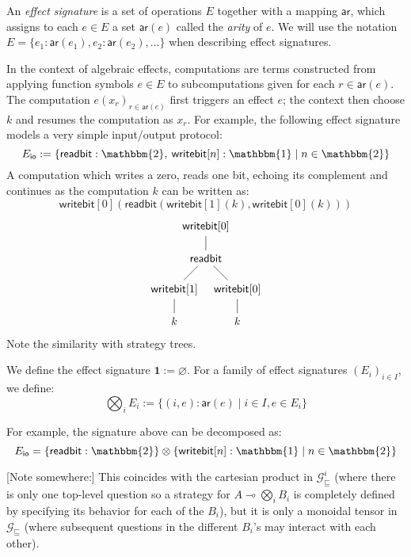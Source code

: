 \documentclass[format=sigplan,authordraft]{acmart}
\newcommand{\gcat}{\mathcal{G}_{\sqsubseteq}}
\newcommand{\kw}[1]{\ensuremath{\mathsf{#1}}}
\begin{document}
\begin{definition}
An \emph{effect signature}
is a set of operations $E$
together with a mapping $\kw{ar}$,
which assigns to each $e \in E$ a set $\kw{ar}(e)$
called the \emph{arity} of $e$.
We will use the notation
$E = \{ e_1 : \kw{ar}(e_1), e_2 : \kw{ar}(e_2), \ldots \}$
when describing effect signatures.
\end{definition}

In the context of algebraic effects,
computations are terms constructed from
applying function symbols $e \in E$
to subcomputations given for each $r \in \kw{ar}(e)$.
The computation $e(x_r)_{r \in \kw{ar}(e)}$
first triggers an effect $e$;
the context then choose $k$
and resumes the computation as $x_r$.
For example,
the following effect signature
models a very simple input/output protocol:
\[
  E_\kw{io} :=
    \{ \kw{readbit} : \mathbbm{2}, \:
       \kw{writebit}[n] : \mathbbm{1} \mid
       n \in \mathbbm{2} \}
\]
A computation which writes a zero,
reads one bit, echoing its complement
and continues as the computation $k$
can be written as:
\[
  \kw{writebit}[0](
    \kw{readbit}(
      \kw{writebit}[1](k),
      \kw{writebit}[0](k)))
\]
\[
  \begin{tikzpicture}
    \node (W) at (0,0) {$\kw{writebit}[0]$};
    \node (R) at (0,-1) {$\kw{readbit}$};
    \node (W0) at (-1,-2) {$\kw{writebit}[1]$};
    \node (W1) at (+1,-2) {$\kw{writebit}[0]$};
    \node (K0) at (-1,-3) {$k$};
    \node (K1) at (+1,-3) {$k$};
    \path (W) edge (R);
    \path (R) edge (W0);
    \path (R) edge (W1);
    \path (W0) edge (K0);
    \path (W1) edge (K1);
  \end{tikzpicture}
\]
Note the similarity with strategy trees.

\begin{definition}
We define the effect signature
$\mathbf{1} := \varnothing$.
For a family of effect signatures $(E_i)_{i \in I}$,
we define:
\[
  \bigotimes_i E_i := \{ (i, e) : \kw{ar}(e) \mid i \in I, e \in E_i \}
\]
\end{definition}

For example,
the signature above can be decomposed as:
\[
    E_\kw{io} = \{ \kw{readbit} : \mathbbm{2} \} \otimes
      \{ \kw{writebit}[n] : \mathbbm{1} \mid n \in \mathbbm{2} \}
\]

[Note somewhere:]
This coincides with the cartesian product in $\gcat^i$
(where there is only one top-level question
so a strategy for $A \multimap \bigotimes_i B_i$
is completely defined
by specifying its behavior for each of the $B_i$),
but it is only a monoidal tensor in $\gcat$
(where subsequent questions in the different $B_i$'s
may interact with each other).
\end{document}
